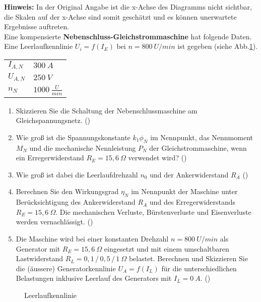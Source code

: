 \begin{question}[topic=gsm,type=exam,tags={20151014}]
\textbf{Hinweis:} In der Original Angabe ist die x-Achse des Diagramms nicht sichtbar, die Skalen auf der x-Achse sind somit geschätzt und es können unerwartete Ergebnisse auftreten.\\
Eine kompensierte \textbf{Nebenschluss-Gleichstrommaschine} hat folgende Daten. Eine Leerlaufkennlinie $U_i=f(I_E)$ bei $n=800~U/min$ ist gegeben (siehe Abb.\ref{fig:20151014}).\\
\begin{tabular}{L{2cm}l}
$I_{A,N}$ \dotfill &$300~A$\\
$U_{A,N}$ \dotfill & $250~V$ \\
$n_N$ \dotfill & $1000~\frac{U}{min}$
\end{tabular}
\begin{enumerate}
\item Skizzieren Sie die Schaltung der Nebenschlussmaschine am Gleichspannungsnetz. ()
\item Wie groß ist die Spannungskonstante $k_1 \phi_N$ im Nennpunkt, das Nennmoment $M_N$ und die mechanische Nennleistung $P_N$ der Gleichstrommaschine, wenn ein Erregerwiderstand $R_E=15,6~\Omega$ verwendet wird? ()
\item Wie groß ist dabei die Leerlaufdrehzahl $n_0$ und der Ankerwiderstand $R_A$ ()
\item Berechnen Sie den Wirkungsgrad $\eta_N$ im Nennpunkt der Maschine unter Berücksichtigung des Ankerwiderstand $R_A$ und des Erregerwiderstands $R_E = 15,6~\Omega$. Die mechanischen Verluste, Bürstenverluste und Eisenverluste werden vernachlässigt. ()
\item Die Maschine wird bei einer konstanten Drehzahl $n=800~U/min$ als Generator mit $R_E =15,6~\Omega$ eingesetzt und mit einem umschaltbaren Lastwiderstand $R_L = 0,1\, /\, 0,5\, /\, 1 ~\Omega$ belastet. Berechnen und Skizzieren Sie die (äussere) Generatorkennlinie $U_A=f(I_L)$ für die unterschiedlichen Belastungen inklusive Leerlauf des Generators mit $I_L = 0~A$. ()
\end{enumerate}
\begin{figure}[H]
\caption{Leerlaufkennlinie} \label{fig:20151014}
\end{figure}
\end{question}
